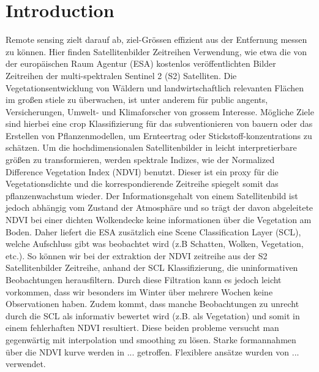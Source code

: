 \chapter{Introduction}

Remote sensing zielt darauf ab, ziel-Grössen effizient aus der Entfernung messen zu können. Hier finden Satellitenbilder Zeitreihen Verwendung, wie etwa die von der europäischen Raum Agentur (ESA) kostenlos veröffentlichten Bilder Zeitreihen der multi-spektralen Sentinel 2 (S2) Satelliten.
Die Vegetationsentwicklung von Wäldern und landwirtschaftlich relevanten Flächen im großen stiele zu überwachen, ist unter anderem für public angents, Versicherungen, Umwelt- und Klimaforscher von grossem Interesse. Mögliche Ziele sind hierbei eine crop Klassifizierung für das subventionieren von bauern oder das Erstellen von Pflanzenmodellen, um Ernteertrag oder Stickstoff-konzentrations zu schätzen. 
Um die hochdimensionalen Satellitenbilder in leicht interpretierbare größen zu transformieren, werden spektrale Indizes, wie der Normalized Difference Vegetation Index (NDVI) benutzt. Dieser ist ein proxy für die Vegetationsdichte und die korrespondierende Zeitreihe spiegelt somit das pflanzenwachstum wieder. 
Der Informationsgehalt von einem Satellitenbild ist jedoch abhängig vom Zustand der Atmosphäre und so trägt der davon abgeleitete NDVI bei einer dichten Wolkendecke keine informationen über die Vegetation am Boden. Daher liefert die ESA zusätzlich eine Scene Classification Layer (SCL), welche Aufschluss gibt was beobachtet wird (z.B Schatten, Wolken, Vegetation, etc.). So können wir bei der extraktion der NDVI zeitreihe aus der S2 Satellitenbilder Zeitreihe, anhand der SCL Klassifizierung, die uninformativen Beobachtungen herausfiltern. Durch diese Filtration kann es jedoch leicht vorkommen, dass wir besonders im Winter über mehrere Wochen keine Observationen haben. Zudem kommt, dass manche Beobachtungen zu unrecht durch die SCL als informativ bewertet wird (z.B. als Vegetation) und somit in einem fehlerhaften NDVI resultiert. 
Diese beiden probleme versucht man gegenwärtig mit interpolation und smoothing zu lösen. Starke formannahmen über die NDVI kurve werden in ... getroffen. Flexiblere ansätze wurden von ... verwendet. 

